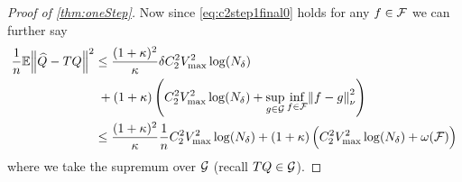 \begin{proof}[Proof of \cref{thm:oneStep}]
  Now since \cref{eq:c2step1final0} holds
  for any $f \in \mathcal{F}$ we can further say
  \begin{align}
    \frac{1}{n} \mathbb{E} \norm{\widehat{Q} - TQ}^2
    & \leq \frac{(1+\kappa)^2}{\kappa} \delta
    C_2^2 V_{\max}^2 \log(N_\delta)
    \notag
    \\ &\; + (1 + \kappa) \left( C_2^2 V_{\max}^2 \log(N_\delta)
      + \sup_{g \in \mathcal{G}} \inf_{f \in \mathcal{F}}
    \norm{f - g}^2_\nu \right)
    \notag
    \\ & \leq \frac{(1+\kappa)^2}{\kappa} \frac{1}{n}
    C_2^2 V_{\max}^2 \log(N_\delta)
    + (1 + \kappa) \left( C_2^2 V_{\max}^2 \log(N_\delta)
    + \omega(\mathcal{F}) \right)
    \label{eq:c2step1final}
  \end{align}
  where we take the supremum over $\mathcal{G}$ (recall $TQ \in \mathcal{G}$).


\end{proof}
